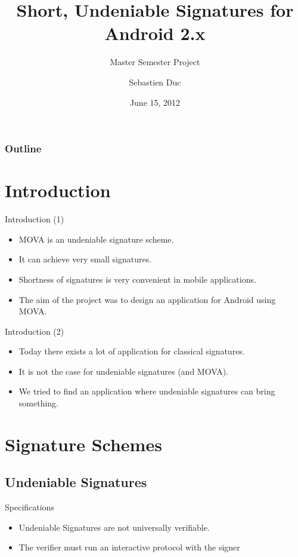 \documentclass{beamer}
\title[Short, Undeniable Signatures for Android 2.x]{Short, Undeniable Signatures for Android 2.x}
\subtitle{Master Semester Project}
\institute{EPFL}
\author[Sebastien Duc]{Sebastien Duc}
\date{June 15, 2012}
\newlength{\wideitemsep}
\let\olditem\item
\renewcommand{\item}{\setlength{\itemsep}{\wideitemsep}\olditem}
\begin{document}
\begin{frame}
    \titlepage
\end{frame}
\begin{frame}
    \frametitle{Outline}
    \tableofcontents[pausesections]
\end{frame}

\section{Introduction}
\begin{frame}{Introduction (1)}
    \begin{itemize}
        \pause \item MOVA is an undeniable signature scheme.
        \pause \item It can achieve very small signatures.
        \pause \item Shortness of signatures is very convenient in mobile applications.
        \pause \item The aim of the project was to design an application for Android using MOVA.
    \end{itemize}
\end{frame}

\begin{frame}{Introduction (2)}
    \begin{itemize}
        \pause \item Today there exists a lot of application for classical signatures.
        \pause \item It is not the case for undeniable signatures (and MOVA).
        \pause \item We tried to find an application where undeniable signatures can bring something.
    \end{itemize}
\end{frame}


\section{Signature Schemes}

\subsection{Undeniable Signatures}

\begin{frame}{Specifications}
    \begin{itemize}
        \pause \item Undeniable Signatures are not universally verifiable. 
        \pause \item The verifier must run an interactive protocol with the signer 
    \end{itemize}
\end{frame}
\end{document}
